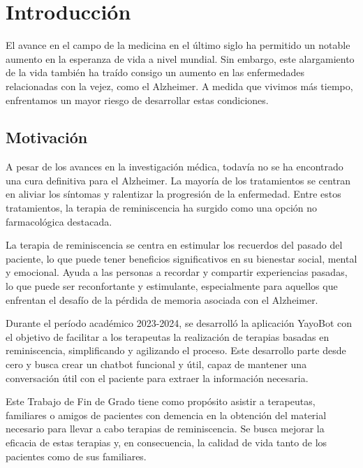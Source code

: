 \chapter{Introducción}
\label{cap:introduccion}




El avance en el campo de la medicina en el último siglo ha permitido un notable aumento en la esperanza de vida a nivel mundial. Sin embargo, este alargamiento de la vida también ha traído consigo un aumento en las enfermedades relacionadas con la vejez, como el Alzheimer. A medida que vivimos más tiempo, enfrentamos un mayor riesgo de desarrollar estas condiciones.


\section{Motivación}

A pesar de los avances en la investigación médica, todavía no se ha encontrado una cura definitiva para el Alzheimer. La mayoría de los tratamientos se centran en aliviar los síntomas y ralentizar la progresión de la enfermedad. Entre estos tratamientos, la terapia de reminiscencia ha surgido como una opción no farmacológica destacada.

La terapia de reminiscencia se centra en estimular los recuerdos del pasado del paciente, lo que puede tener beneficios significativos en su bienestar social, mental y emocional. Ayuda a las personas a recordar y compartir experiencias pasadas, lo que puede ser reconfortante y estimulante, especialmente para aquellos que enfrentan el desafío de la pérdida de memoria asociada con el Alzheimer.

Durante el período académico 2023-2024, se desarrolló la aplicación YayoBot con el objetivo de facilitar a los terapeutas la realización de terapias basadas en reminiscencia, simplificando y agilizando el proceso. Este desarrollo parte desde cero y busca crear un chatbot funcional y útil, capaz de mantener una conversación útil con el paciente para extraer la información necesaria.

Este Trabajo de Fin de Grado tiene como propósito asistir a terapeutas, familiares o amigos de pacientes con demencia en la obtención del material necesario para llevar a cabo terapias de reminiscencia. Se busca mejorar la eficacia de estas terapias y, en consecuencia, la calidad de vida tanto de los pacientes como de sus familiares. 
